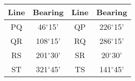 \begin{table}[h!]
    \centering
    \begin{tabular}{|c|c|@{\hskip 10pt}|c|c|}
        \hline
        \textbf{Line} & \textbf{Bearing} & \textbf{Line} & \textbf{Bearing} \\
        \hline
        PQ & 46$^\circ$15' & QP & 226$^\circ$15' \\
        \hline
        QR & 108$^\circ$15' & RQ & 286$^\circ$15' \\
        \hline
        RS & 201$^\circ$30' & SR & 20$^\circ$30' \\
        \hline
        ST & 321$^\circ$45' & TS & 141$^\circ$45' \\
        \hline
    \end{tabular}
\end{table}

